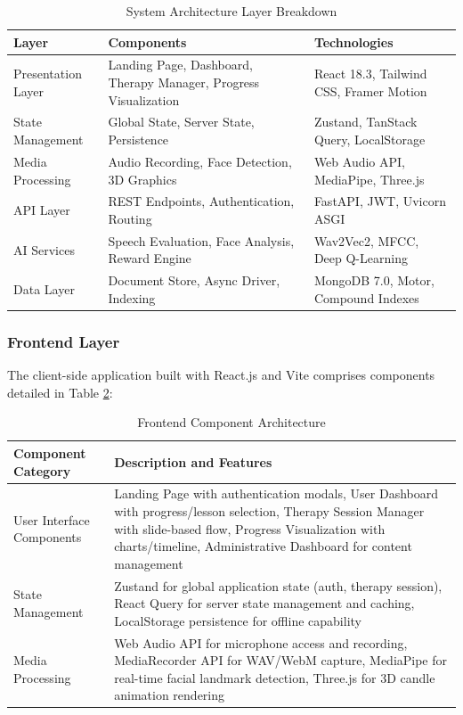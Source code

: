 \documentclass[12pt,a4paper]{article}
\begin{document}
\begin{table}[H]
\centering
\caption{System Architecture Layer Breakdown}
\label{tab:architecture_layers}
\small
\begin{tabular}{p{3cm}p{5cm}p{5.5cm}}
\toprule
\textbf{Layer} & \textbf{Components} & \textbf{Technologies} \\
\midrule
Presentation Layer & Landing Page, Dashboard, Therapy Manager, Progress Visualization & React 18.3, Tailwind CSS, Framer Motion \\
\hline
State Management & Global State, Server State, Persistence & Zustand, TanStack Query, LocalStorage \\
\hline
Media Processing & Audio Recording, Face Detection, 3D Graphics & Web Audio API, MediaPipe, Three.js \\
\hline
API Layer & REST Endpoints, Authentication, Routing & FastAPI, JWT, Uvicorn ASGI \\
\hline
AI Services & Speech Evaluation, Face Analysis, Reward Engine & Wav2Vec2, MFCC, Deep Q-Learning \\
\hline
Data Layer & Document Store, Async Driver, Indexing & MongoDB 7.0, Motor, Compound Indexes \\
\bottomrule
\end{tabular}
\end{table}

\subsubsection{Frontend Layer}

The client-side application built with React.js and Vite comprises components detailed in Table \ref{tab:frontend_components}:

\begin{table}[H]
\centering
\caption{Frontend Component Architecture}
\label{tab:frontend_components}
\begin{tabular}{p{5cm}p{8.5cm}}
\toprule
\textbf{Component Category} & \textbf{Description and Features} \\
\midrule
User Interface Components & Landing Page with authentication modals, User Dashboard with progress/lesson selection, Therapy Session Manager with slide-based flow, Progress Visualization with charts/timeline, Administrative Dashboard for content management \\
\hline
State Management & Zustand for global application state (auth, therapy session), React Query for server state management and caching, LocalStorage persistence for offline capability \\
\hline
Media Processing & Web Audio API for microphone access and recording, MediaRecorder API for WAV/WebM capture, MediaPipe for real-time facial landmark detection, Three.js for 3D candle animation rendering \\
\bottomrule
\end{tabular}
\end{table}
\end{document}
